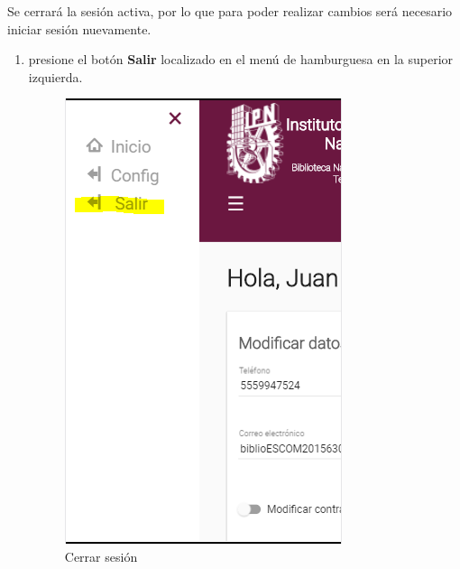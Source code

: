 Se cerrará la sesión activa, por lo que para poder realizar
cambios será necesario iniciar sesión nuevamente.
\begin{enumerate}
	\item presione el botón \textbf{Salir} localizado en el menú de hamburguesa 
		en la superior izquierda.
		
		\begin{figure}[hbtp]
		
		\includegraphics[scale=0.3]{images/InterfazMovil/IUGS10_logoutSolicitante.png}
		\caption{Cerrar sesión }
	\end{figure}
	
\end{enumerate}


	